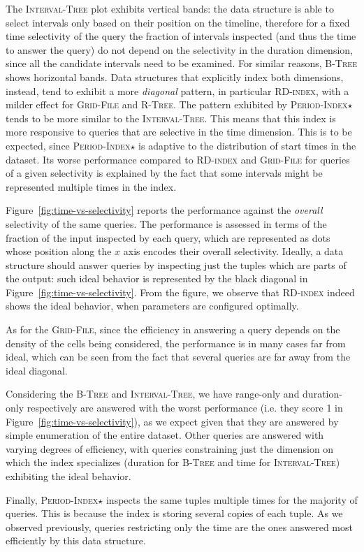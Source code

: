 \documentclass[sigconf,nonacm,anonymous]{acmart}
\theoremstyle{definition}
\newcommand{\algo}[1]{\textsc{#1}}
\newcommand{\ours}{\algo{RD-index}\xspace}
\newcommand{\qdo}{duration-only\xspace}
\newcommand{\qro}{range-only\xspace}
\newcommand{\btree}{\algo{B-Tree}\xspace}
\newcommand{\rtree}{\algo{R-Tree}\xspace}
\newcommand{\itree}{\algo{Interval-Tree}\xspace}
\newcommand{\gfile}{\algo{Grid-File}\xspace}
\newcommand{\pindex}{\algo{Period-Index$\star$}\xspace}
\begin{document}
The \itree plot exhibits vertical bands: the data structure is able to select intervals
only based on their position on the timeline, therefore for a fixed time selectivity of the query
the fraction of intervals inspected (and thus the time to answer the query)
do not depend on the selectivity in the duration dimension,
since all the candidate intervals need to be examined.
For similar reasons, \btree shows horizontal bands.
Data structures that explicitly index both dimensions, instead, tend to exhibit a more \emph{diagonal}
pattern, in particular \ours{}, with a milder effect for \gfile and \rtree.
The pattern exhibited by \pindex tends to be more similar to the \itree.
This means that this index is more responsive to queries that are selective in the time dimension.
This is to be expected, since \pindex is adaptive to the distribution of start times
in the dataset.
Its worse performance compared to \ours and \gfile for queries of a given selectivity
is explained by the fact that some intervals might be represented multiple times in the index.

Figure~\ref{fig:time-vs-selectivity} reports the performance against
the \emph{overall} selectivity of the same queries.
The performance is assessed in terms of the fraction of the input inspected
by each query, which are represented as dots whose position along the $x$
axis encodes their overall selectivity.
Ideally, a data structure should answer queries by inspecting just the
tuples which are parts of the output: such ideal behavior is represented
by the black diagonal in Figure~\ref{fig:time-vs-selectivity}.
From the figure, we observe that \ours indeed shows the ideal behavior,
when parameters are configured optimally.

As for the \gfile, since the efficiency in answering a query depends on the density of the cells being considered, the performance is in many cases far from ideal, which can be seen from the fact that several queries are far away from the ideal diagonal.

Considering the \btree and \itree, we have \qro and \qdo respectively
are answered with the worst performance (i.e. they score 1 in Figure~\ref{fig:time-vs-selectivity}), as we expect given that they are answered
by simple enumeration of the entire dataset.
Other queries are answered with varying degrees of efficiency, with queries constraining
just the dimension on which the index specializes (duration for \btree and time for \itree) exhibiting the ideal behavior.

Finally, \pindex inspects the same tuples multiple times for the majority of queries. This is because the index is storing several copies of each tuple.
As we observed previously, queries restricting only the time are the ones answered most efficiently
by this data structure.
\end{document}
